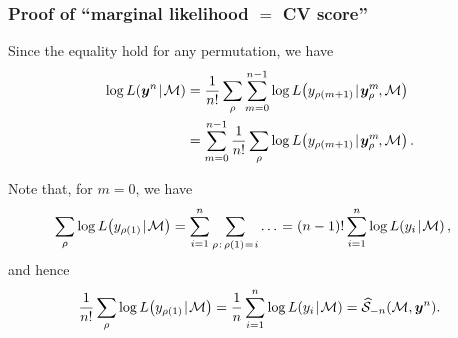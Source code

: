 \documentclass[18pt, handout]{beamer}
\newcommand{\defineTightSpacing}{%
	\setlength{\abovedisplayskip}{.25\baselineskip}%
	\setlength{\belowdisplayskip}{.25\baselineskip}%
}
\newcommand{\given}{\thinnerspace | \thinnerspace}
\newcommand{\spacedEq}{\mkern 1mu = \mkern 1.5mu}
\newcommand{\thinnerspace}{\mskip.5\thinmuskip}
\newcommand{\negthinnerspace}{\mskip-.5\thinmuskip}
\newcommand{\likelihood}{L}
\newcommand{\by}{\bm{y}}
\newcommand{\score}{\mathcal{S}}
\newcommand{\modelSymbol}{\mathcal{M}}
\newcommand{\permutation}{\rho}
\newcommand{\trainingSize}{m}
\newcommand{\testSampleIndex}{i}
\begin{document}
\begin{frame}
\frametitle{Proof of ``marginal likelihood $=$ {\large CV} score''}
Since the equality hold for any permutation, we have
\begin{equation*} \defineTightSpacing%
\begin{aligned}
\log \likelihood(\by^n \given \modelSymbol)
	&= \frac{1}{n!} \sum_\permutation \sum_{m = 0}^{n - 1} \log \likelihood\!\left(y_{\permutation(\trainingSize + 1)} \given \by_\permutation^\trainingSize\negthinnerspace, \modelSymbol \right) \\
	&= \sum_{m = 0}^{n - 1} \frac{1}{n!} \sum_\permutation  \log \likelihood\!\left(y_{\permutation(\trainingSize + 1)} \given \by_\permutation^\trainingSize\negthinnerspace, \modelSymbol \right).
\end{aligned}
\end{equation*}

Note that, for $m = 0$, we have 
\begin{equation*} \defineTightSpacing%
\begin{aligned}
\sum_\permutation \log \likelihood\!\left(y_{\permutation(1)} \given \modelSymbol \right)
	= \sum_{\testSampleIndex = 1}^n \sum_{\permutation \thinnerspace : \, \permutation(1) \spacedEq i} \ldots \thinnerspace
	&= (n - 1)! \sum_{\testSampleIndex = 1}^n \log \likelihood\!\left(y_\testSampleIndex \given \modelSymbol \right),
\end{aligned}
\end{equation*}
and hence
\begin{equation*} \defineTightSpacing%
\frac{1}{n!} \sum_\permutation \log \likelihood\!\left(y_{\permutation(1)} \given \modelSymbol \right)
	= \frac{1}{n} \sum_{\testSampleIndex = 1}^n \log \likelihood\!\left(y_\testSampleIndex \given \modelSymbol \right)
	= \widehat{\score}_{-n}(\modelSymbol, \by^n).
\end{equation*}
\end{frame}
\end{document}
